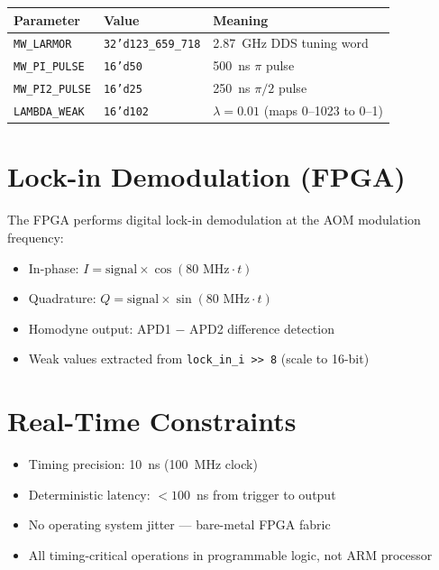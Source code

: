 \documentclass[11pt,a4paper,openany]{book}
\begin{document}
\begin{center}
\begin{tabular}{lll}
\toprule
\textbf{Parameter} & \textbf{Value} & \textbf{Meaning} \\
\midrule
\texttt{MW\_LARMOR} & \texttt{32'd123\_659\_718} & 2.87~GHz DDS tuning word \\
\texttt{MW\_PI\_PULSE} & \texttt{16'd50} & 500~ns $\pi$ pulse \\
\texttt{MW\_PI2\_PULSE} & \texttt{16'd25} & 250~ns $\pi/2$ pulse \\
\texttt{LAMBDA\_WEAK} & \texttt{16'd102} & $\lambda = 0.01$ (maps 0--1023 to 0--1) \\
\bottomrule
\end{tabular}
\end{center}

\section{Lock-in Demodulation (FPGA)}

The FPGA performs digital lock-in demodulation at the AOM modulation frequency:

\begin{itemize}[nosep]
  \item In-phase: $I = \text{signal} \times \cos(80\text{~MHz} \cdot t)$
  \item Quadrature: $Q = \text{signal} \times \sin(80\text{~MHz} \cdot t)$
  \item Homodyne output: APD1 $-$ APD2 difference detection
  \item Weak values extracted from \texttt{lock\_in\_i >> 8} (scale to 16-bit)
\end{itemize}

\section{Real-Time Constraints}

\begin{itemize}[nosep]
  \item Timing precision: 10~ns (100~MHz clock)
  \item Deterministic latency: $< 100$~ns from trigger to output
  \item No operating system jitter --- bare-metal FPGA fabric
  \item All timing-critical operations in programmable logic, not ARM processor
\end{itemize}
\end{document}
